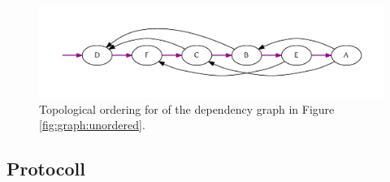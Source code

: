 	\begin{figure}[!htb]
		\centering
		\includegraphics[width=1\textwidth]{figures/ordered-graph.pdf} %
		\caption{\label{fig:graph:ordered} Topological ordering for of the dependency graph in Figure \ref{fig:graph:unordered}.}
	\end{figure}

	\subsection{Protocoll}
